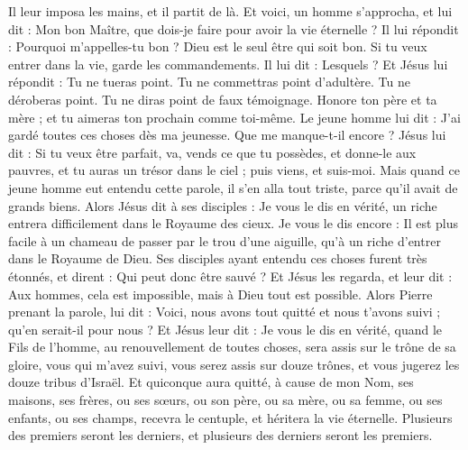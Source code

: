 \begin{multicols}{2}
Il leur imposa les mains, et il partit de là.
Et voici, un homme s'approcha, et lui dit : Mon bon Maître, que dois-je faire pour avoir la vie éternelle ?
Il lui répondit : Pourquoi m'appelles-tu bon ? Dieu est le seul être qui soit bon. Si tu veux entrer dans la vie, garde les commandements.
Il lui dit : Lesquels ? Et Jésus lui répondit : Tu ne tueras point. Tu ne commettras point d’adultère. Tu ne déroberas point. Tu ne diras point de faux témoignage.
Honore ton père et ta mère ; et tu aimeras ton prochain comme toi-même{}.
Le jeune homme lui dit : J’ai gardé toutes ces choses dès ma jeunesse. Que me manque-t-il encore ?
Jésus lui dit : Si tu veux être parfait, va, vends ce que tu possèdes, et donne-le aux pauvres, et tu auras un trésor dans le ciel ; puis viens, et suis-moi.
Mais quand ce jeune homme eut entendu cette parole, il s'en alla tout triste, parce qu'il avait de grands biens.
Alors Jésus dit à ses disciples : Je vous le dis en vérité, un riche entrera difficilement dans le Royaume des cieux.
Je vous le dis encore : Il est plus facile à un chameau de passer par le trou d'une aiguille{}, qu’à un riche d’entrer dans le Royaume de Dieu.
Ses disciples ayant entendu ces choses furent très étonnés, et dirent : Qui peut donc être sauvé ?
Et Jésus les regarda, et leur dit : Aux hommes, cela est impossible, mais à Dieu tout est possible.
Alors Pierre prenant la parole, lui dit : Voici, nous avons tout quitté et nous t'avons suivi ; qu’en serait-il pour nous ?
Et Jésus leur dit : Je vous le dis en vérité, quand le Fils de l’homme, au renouvellement de toutes choses, sera assis sur le trône de sa gloire, vous qui m’avez suivi, vous serez assis sur douze trônes, et vous jugerez les douze tribus d'Israël.
Et quiconque aura quitté, à cause de mon Nom, ses maisons, ses frères, ou ses sœurs, ou son père, ou sa mère, ou sa femme, ou ses enfants, ou ses champs, recevra le centuple, et héritera la vie éternelle.
Plusieurs des premiers seront les derniers, et plusieurs des derniers seront les premiers.

\end{multicols}
